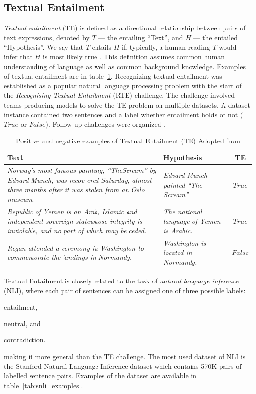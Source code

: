 \subsection{Textual Entailment}
\label{sec:textual_entailment}

\textit{Textual entailment} (TE) is defined as a directional relationship
between pairs of text expressions, denoted by $T$ --- the entailing ``Text'',
and $H$ --- the entailed ``Hypothesis''. We say that $T$ entails $H$ if,
typically, a human reading $T$ would infer that $H$ is most likely true 
\citep{dagan2005pascal}.  This definition assumes common human understanding of
language as well as common background knowledge. Examples of textual entailment
are in
table~\ref{tab:te_examples}.  
Recognizing textual entailment was established as
a popular natural language processing problem with the start of the
\textit{Recognising Textual Entailment} (RTE) challenge. The challenge involved
teams producing models to solve the TE problem on multiple datasets. A dataset
instance contained two sentences and a label whether entailment holds or not
($\mathit{True}$ or $\mathit{False}$).
Follow up challenges were organized \citep{bar2006second, giampiccolo2007third}.

\begin{table}
	\centering
	\begin{tabular}{p{8cm} | p{5cm} | c}
		Text & Hypothesis & TE \\
		\toprule
		\textit{
		Norway’s most famous painting, ``TheScream'' by Edvard Munch, was recov-ered
		Saturday, almost three months after it was stolen from an Oslo
		museum.} & 
		\textit{Edvard   Munch   painted ``The Scream''  }
		& $\mathit{True}$ \\
		\textit{Republic of Yemen is an Arab, Islamic and independent
		sovereign statewhose integrity is inviolable,  and  no part
		of which may be ceded.} & 
		\textit{The national language of Yemen is Arabic.}
		& $\mathit{True}$ \\
		\textit{Regan attended a ceremony in Washington to commemorate the
		landings in Normandy.} &
		\textit{Washington is located in Normandy. } & $\mathit{False}$ \\
		\bottomrule
	\end{tabular}
	\caption{Positive and negative examples of Textual Entailment (TE) 
	Adopted from \citep{dagan2005pascal}}
	\label{tab:te_examples}
\end{table}

Textual Entailment is closely related to the task of \textit{natural language inference} (NLI), 
where each pair of sentences can be assigned one of three possible labels:
\begin{enumerate*}
	\item entailment, 
	\item neutral, and
	\item contradiction. 
\end{enumerate*} 
making it more general than the TE challenge. 
The most used dataset of NLI is the Stanford Natural Language Inference dataset
\citep{bowman2015large} which contains 570K pairs of labelled sentence pairs. 
Examples of the dataset are available in table~\ref{tab:snli_examples}.

